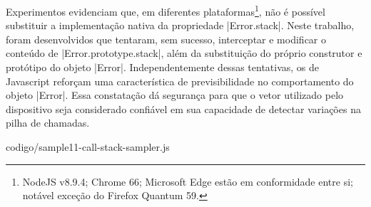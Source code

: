 Experimentos evidenciam que, em diferentes plataformas\footnote{NodeJS v8.9.4; Chrome 66; Microsoft Edge estão em conformidade entre si; notável exceção do Firefox Quantum 59.}, não é possível substituir a implementação nativa da propriedade |Error.stack|. Neste trabalho, foram desenvolvidos {\scripts} que tentaram, sem sucesso, interceptar e modificar o conteúdo de |Error.prototype.stack|, além da substituição do próprio construtor e protótipo do objeto |Error|. Independentemente dessas tentativas, os  de Javascript reforçam uma característica de previsibilidade no comportamento do objeto |Error|. Essa constatação dá segurança para que o vetor utilizado pelo dispositivo seja considerado confiável em sua capacidade de detectar variações na pilha de chamadas.


	{codigo/sample11-call-stack-sampler.js}